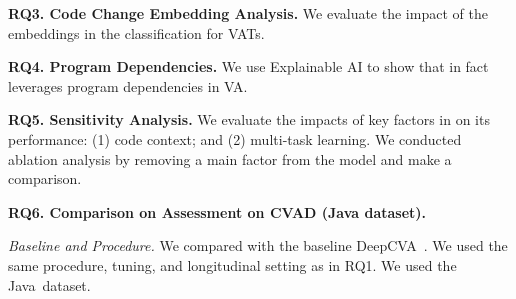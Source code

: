 







\vspace{1pt}
\noindent\textbf{RQ3. Code Change Embedding Analysis.} We evaluate the impact of the embeddings in the classification for VATs.

\noindent\textbf{RQ4. Program Dependencies.} We use
Explainable AI to show that {\tool} in fact leverages program
dependencies in VA.



\vspace{1pt}
\noindent\textbf{RQ5. Sensitivity Analysis.}  We evaluate the impacts
of key factors in {\tool} on its performance: (1) code
context; and (2) multi-task learning. We conducted ablation analysis
by removing a main factor from the model and make a comparison.

\vspace{3pt}
\noindent\textbf{RQ6. Comparison on Assessment on CVAD (Java dataset).}

{\em Baseline and Procedure.} We compared {\tool} with the baseline
DeepCVA~\cite{deepCVA-ase21}. We used the same procedure, tuning, and
longitudinal setting as in RQ1. We used the Java~dataset.








